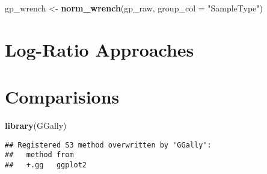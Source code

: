 \documentclass[
]{book}
\newenvironment{Shaded}{\begin{snugshade}}{\end{snugshade}}
\newcommand{\DataTypeTok}[1]{\textcolor[rgb]{0.13,0.29,0.53}{#1}}
\newcommand{\KeywordTok}[1]{\textcolor[rgb]{0.13,0.29,0.53}{\textbf{#1}}}
\newcommand{\NormalTok}[1]{#1}
\newcommand{\StringTok}[1]{\textcolor[rgb]{0.31,0.60,0.02}{#1}}
\begin{document}
\begin{Shaded}
\begin{Highlighting}[]
\NormalTok{gp\_wrench \textless{}{-}}\StringTok{ }\KeywordTok{norm\_wrench}\NormalTok{(gp\_raw, }\DataTypeTok{group\_col =} \StringTok{"SampleType"}\NormalTok{)}
\end{Highlighting}
\end{Shaded}

\hypertarget{log-ratio-approaches}{%
\chapter{Log-Ratio Approaches}\label{log-ratio-approaches}}

\hypertarget{comparisions}{%
\chapter{Comparisions}\label{comparisions}}

\begin{Shaded}
\begin{Highlighting}[]
\KeywordTok{library}\NormalTok{(GGally)}
\end{Highlighting}
\end{Shaded}

\begin{verbatim}
## Registered S3 method overwritten by 'GGally':
##   method from   
##   +.gg   ggplot2
\end{verbatim}
\end{document}
